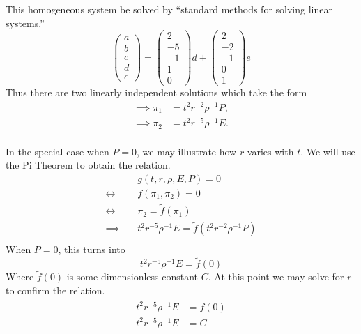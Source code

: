 \documentclass[12pt]{article}
\begin{document}
  This homogeneous system be solved by ``standard methods for solving linear systems.''
  \begin{equation*}
    \begin{pmatrix}
      a \\ b \\ c \\ d \\ e
    \end{pmatrix}
    =
    \begin{pmatrix}
      2 \\ -5 \\ -1 \\ 1 \\ 0
    \end{pmatrix} d
    +
    \begin{pmatrix}
      2 \\ -2 \\ -1 \\ 0 \\ 1
    \end{pmatrix}
    e
  \end{equation*}
  Thus there are two linearly independent solutions which take the form
  \begin{equation}
    \label{eq:4-p-ne-sol}
    \boxed{
      \begin{aligned}
        \implies \pi_1 &= t^2r^{-2}\rho^{-1}P, \\
        \implies \pi_2 &= t^2r^{-5}\rho^{-1}E. \\
      \end{aligned}
    }
  \end{equation}

  In the special case when $P=0$, we may illustrate how $r$ varies with $t$. We
  will use the Pi Theorem to obtain the relation.
  \begin{equation*}
    \begin{aligned}
      & g(t,r,\rho,E,P) = 0 \\
      \leftrightarrow\quad& f(\pi_1, \pi_2) = 0 \\
      \leftrightarrow\quad& \pi_2 = \tilde{f}(\pi_1) \\
      \implies\quad& t^2r^{-5}\rho^{-1}E = \tilde{f}(t^2r^{-2}\rho^{-1}P) \\
    \end{aligned}
  \end{equation*}
  When $P=0$, this turns into
  \begin{equation*}
    t^2r^{-5}\rho^{-1}E = \tilde{f}(0)
  \end{equation*}
  Where $\tilde{f}(0)$ is some dimensionless constant $C$. At this point we may
  solve for $r$ to confirm the relation.
  \begin{equation*}
    \begin{aligned}
      t^2r^{-5}\rho^{-1}E &= \tilde{f}(0) \\
      t^2r^{-5}\rho^{-1}E &= C \\
    \end{aligned}
  \end{equation*}
\end{document}
